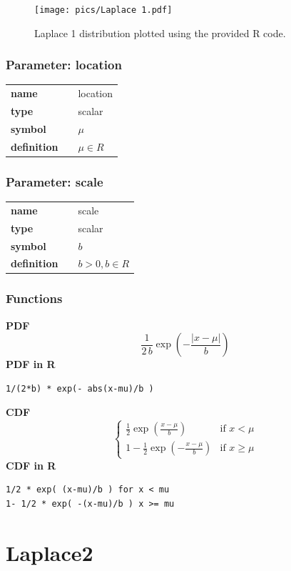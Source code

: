 \documentclass{article}
\begin{document}
\begin{figure}[ht!]
\centering
  \texttt{[image: pics/Laplace 1.pdf]}
 \caption{Laplace 1 distribution plotted using the provided R code.}
 \label{fig:Laplace 1}
\end{figure}

\subsubsection*{Parameter: location}

\noindent\begin{tabular}{p{2cm}cl}
\textbf{name} & & location \\
\textbf{type} & & scalar \\
\textbf{symbol} & & $\mu$  \\
\textbf{definition} & & $\mu \in R$
\end{tabular}
\subsubsection*{Parameter: scale}

\noindent\begin{tabular}{p{2cm}cl}
\textbf{name} & & scale \\
\textbf{type} & & scalar \\
\textbf{symbol} & & $b$  \\
\textbf{definition} & & $b > 0, b \in R$
\end{tabular}
\subsubsection*{Functions}

\smallskip \noindent \hspace{.2cm} \textbf{PDF} 
\begin{equation*}\frac{1}{2\,b} \exp \left(-\frac{|x-\mu|}b \right)\end{equation*}
\smallskip \noindent \hspace{.2cm} \textbf{PDF in R}  
\begin{verbatim}1/(2*b) * exp(- abs(x-mu)/b )\end{verbatim}
\smallskip \noindent \hspace{.2cm} \textbf{CDF} 
\begin{equation*}\begin{cases}
      \frac12 \exp \left( \frac{x-\mu}{b} \right) & \mbox{if }x < \mu \\
          1-\frac12 \exp \left( -\frac{x-\mu}{b} \right) & \mbox{if }x \geq \mu
       \end{cases}\end{equation*}
\smallskip \noindent \hspace{.2cm} \textbf{CDF in R} 
\begin{verbatim}1/2 * exp( (x-mu)/b ) for x < mu
1- 1/2 * exp( -(x-mu)/b ) x >= mu\end{verbatim}
\smallskip\section*{Laplace2} 
\end{document}
